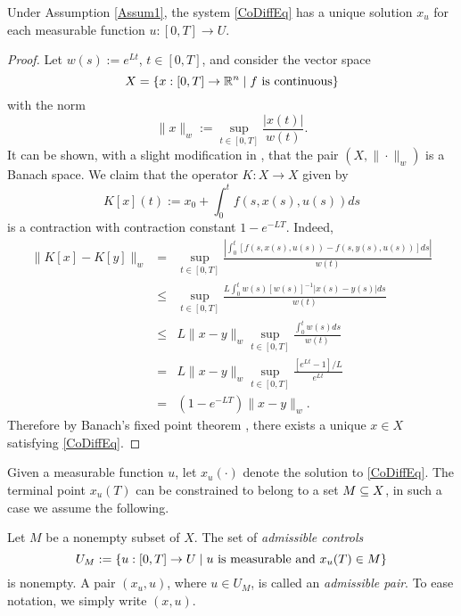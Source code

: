 \begin{theorem}\label{ExAdmisPair} 
	Under Assumption \ref{Assum1}, the system 
	\eqref{CoDiffEq} has a unique 	solution $x_u$ for each measurable function 
	$u:[0,T]\to U$. %
\end{theorem}
\begin{proof} 
Let $w(s):=e^{Lt}$, $t\in [0,T]$, and consider the vector space 
    \[X=\{x:[0,T]\to \mathbb{R}^n\mid f \mbox{ is continuous}\}\] 
with the norm
    \[ \|x\|_w:=\sup_{t\in[0,T]} \frac{|x(t)|}{w(t)}. \]
It can be shown, with a slight modification in \cite[Section 2.1]{Teschl}, that the pair $(X,\|\cdot\|_w)$ is a Banach space. We claim that the operator $K:X\to X$ given by 
    \[ K[x](t):=x_0 + \int_0^t f(s,x(s),u(s))ds\]
is a contraction with contraction constant $1-e^{-LT}$. Indeed, 
    \begin{eqnarray*}
    \| K[x] - K[y] \|_w & = & \sup_{t\in[0,T]} \frac{|\int_0^t [f(s,x(s),u(s)) -f(s,y(s),u(s))]ds|}{w(t)}\\
        & \leq &   \sup_{t\in[0,T]} \frac{L\int_0^t w(s)[w(s)]^{-1}|x(s) -y(s)|ds}{w(t)}\\
        &\leq &  L\|x-y\|_w \sup_{t\in[0,T]} \frac{\int_0^t w(s)ds}{w(t)}\\
        & = &  L\|x-y\|_w \sup_{t\in[0,T]}\frac{[e^{Lt}-1]/L}{e^{Lt}}\\
        & = &  (1-e^{-LT})\|x-y\|_w. 
    \end{eqnarray*}
Therefore by Banach's fixed point theorem \cite[Theorem 2.1]{Teschl}, there exists a unique $x\in X$ satisfying \eqref{CoDiffEq}.
\end{proof}


	Given a measurable function $u$, let $x_u(\cdot)$ denote the solution to 
\eqref{CoDiffEq}. The terminal point $x_u(T)$ can be constrained to belong to a 
set $M\subseteq X$, in such a case we assume the following. 

\begin{assumption} Let $M$ be a nonempty subset of $X$. 
	The set of {\it admissible controls} 
	\begin{equation}\label{FeasCont}  
		 U_M:=\{u:[0,T]\to U\mid u\  
		 \mbox{\rm is measurable and } x_u(T)\in M\} 
	\end{equation}
	is nonempty. A pair $(x_u,u)$, where $u\in U_M$, is called an 
	{\it admissible pair}. To ease notation, we simply write $(x,u)$.
\end{assumption}


